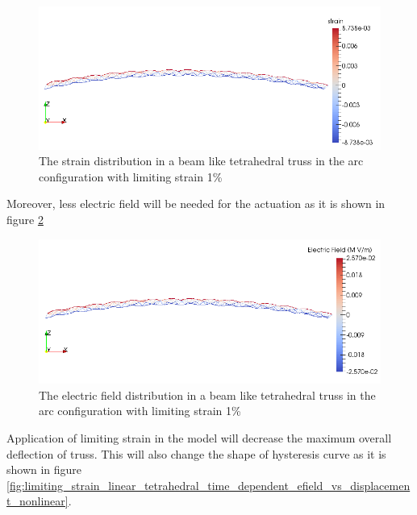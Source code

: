 \begin{figure}  
\centering
\includegraphics[width=5.0in]{./chap_5_active_trusses/images_non_linear_time_dependent_constitutive_equatio/limiting_strain_linear_tetrahedral_bending_strain_contour.png}
\caption{The strain distribution in a beam like tetrahedral truss in the arc configuration with limiting strain 1\%}
\label{fig:limiting_strain_linear_tetrahedral_bending_strain_contour}
\end{figure}  

Moreover, less electric field will be needed for the actuation as it is shown in figure \ref{fig:limiting_strain_linear_tetrahedral_bending_electric_field_contour}

\begin{figure}  
\centering
\includegraphics[width=5.0in]{./chap_5_active_trusses/images_non_linear_time_dependent_constitutive_equatio/limiting_strain_linear_tetrahedral_bending_electric_field_contour.png}
\caption{The electric field distribution in a beam like tetrahedral truss in the arc configuration with limiting strain 1\%}
\label{fig:limiting_strain_linear_tetrahedral_bending_electric_field_contour}
\end{figure} 

Application of limiting strain in the model will decrease the maximum overall deflection of truss.
This will also change the shape of hysteresis curve as it is shown in figure \ref{fig:limiting_strain_linear_tetrahedral_time_dependent_efield_vs_displacement_nonlinear}.

